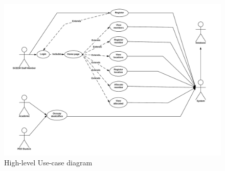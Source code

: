 \documentclass[11pt,a4paper]{article}
\begin{document}
\begin{figure}[!h]
    \centering
    \includegraphics[width=\linewidth]{use_case.png}
    \caption{High-level Use-case diagram}
    \label{fig:basic_2}
\end{figure}
\end{document}
